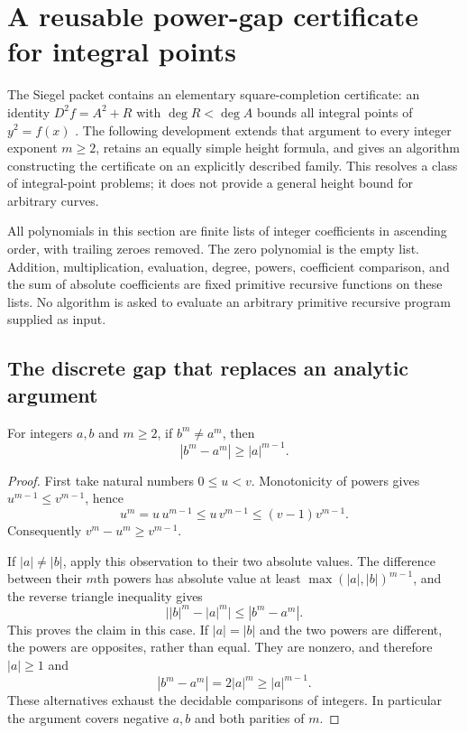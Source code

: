 \section{A reusable power-gap certificate for integral points}
\label{dio:section}

The Siegel packet contains an elementary square-completion certificate:
an identity $D^2f=A^2+R$ with $\deg R<\deg A$ bounds all integral points
of $y^2=f(x)$ \cite{repoSiegel}.  The following development extends that argument to every
integer exponent $m\geq2$, retains an equally simple height formula, and
gives an algorithm constructing the certificate on an explicitly described
family.  This resolves a class of integral-point problems; it does not
provide a general height bound for arbitrary curves.

All polynomials in this section are finite lists of integer coefficients
in ascending order, with trailing zeroes removed.  The zero polynomial is
the empty list.  Addition, multiplication, evaluation, degree, powers,
coefficient comparison, and the sum of absolute coefficients are fixed
primitive recursive functions on these lists.  No algorithm is asked to
evaluate an arbitrary primitive recursive program supplied as input.

\subsection{The discrete gap that replaces an analytic argument}

\begin{lemma}
\label{dio:gap}
For integers $a,b$ and $m\geq2$, if $b^m\ne a^m$, then
\[
             |b^m-a^m|\geq |a|^{m-1}.
\]
\end{lemma}
\begin{proof}
First take natural numbers $0\leq u<v$.  Monotonicity of powers gives
$u^{m-1}\leq v^{m-1}$, hence
\[
 u^m=u\,u^{m-1}\leq u\,v^{m-1}
                 \leq(v-1)v^{m-1}.
\]
Consequently $v^m-u^m\geq v^{m-1}$.

If $|a|\ne|b|$, apply this observation to their two absolute values.
The difference between their $m$th powers has absolute value at least
$\max(|a|,|b|)^{m-1}$, and the reverse triangle inequality gives
\[
 \bigl||b|^m-|a|^m\bigr|\leq |b^m-a^m|.
\]
This proves the claim in this case.  If $|a|=|b|$ and the two powers
are different, the powers are opposites, rather than equal.  They
are nonzero, and therefore $|a|\geq1$ and
\[
             |b^m-a^m|=2|a|^m\geq |a|^{m-1}.
\]
These alternatives exhaust the decidable comparisons of integers.
In particular the argument covers negative $a,b$ and both parities of $m$.
\end{proof}


